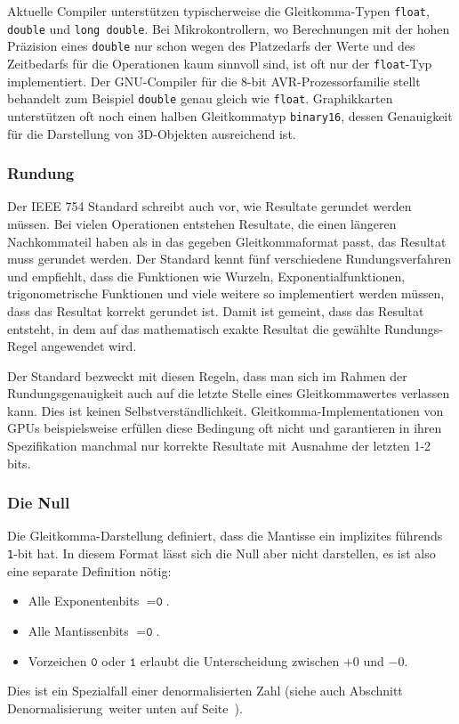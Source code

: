 Aktuelle Compiler unterstützen typischerweise die Gleitkomma-Typen
\texttt{float}, \texttt{double} und \texttt{long double}.
Bei Mikrokontrollern, wo Berechnungen mit der hohen Präzision
eines \texttt{double} nur schon wegen des Platzedarfs der Werte
und des Zeitbedarfs für die Operationen kaum sinnvoll sind, ist oft
nur der \texttt{float}-Typ implementiert.
Der GNU-Compiler für die 8-bit AVR-Prozessorfamilie stellt behandelt
zum Beispiel \texttt{double} genau gleich wie \texttt{float}.
Graphikkarten unterstützen oft noch einen halben Gleitkommatyp
\texttt{binary16}, dessen Genauigkeit für die Darstellung von 3D-Objekten
ausreichend ist.

\subsubsection{Rundung}
Der IEEE 754 Standard schreibt auch vor, wie Resultate gerundet werden
müssen.
Bei vielen Operationen entstehen Resultate, die einen längeren 
Nachkommateil haben als in das gegeben Gleitkommaformat passt,
das Resultat muss gerundet werden.
Der Standard kennt fünf verschiedene Rundungsverfahren und empfiehlt,
dass die Funktionen wie Wurzeln, Exponentialfunktionen,
trigonometrische Funktionen und viele weitere so implementiert werden 
müssen, dass das Resultat korrekt gerundet ist.
Damit ist gemeint, dass das Resultat entsteht, in dem auf das
mathematisch exakte Resultat die gewählte Rundungs-Regel angewendet
wird.

Der Standard bezweckt mit diesen Regeln, dass man sich im Rahmen der
Rundungsgenauigkeit auch auf die letzte Stelle eines Gleitkommawertes
verlassen kann.
Dies ist keinen Selbstverständlichkeit.
Gleitkomma-Implementationen von GPUs beispielsweise erfüllen diese
Bedingung oft nicht und garantieren in ihren Spezifikation manchmal
nur korrekte Resultate mit Ausnahme der letzten 1-2 bits.

\subsubsection{Die Null}
Die Gleitkomma-Darstellung definiert, dass die Mantisse ein implizites
führends \texttt{1}-bit hat. 
In diesem Format lässt sich die Null aber nicht darstellen, es ist
also eine separate Definition nötig:
\begin{itemize}
\item Alle Exponentenbits $=\texttt{0}$.
\item Alle Mantissenbits $=\texttt{0}$.
\item Vorzeichen $\texttt{0}$ oder $\texttt{1}$ erlaubt die Unterscheidung
zwischen $+0$ und $-0$.
\end{itemize}
Dies ist ein Spezialfall einer denormalisierten Zahl (siehe auch
Abschnitt Denormalisierung weiter unten auf
Seite~\pageref{buch:zahlensysteme:denormalisierung}).

